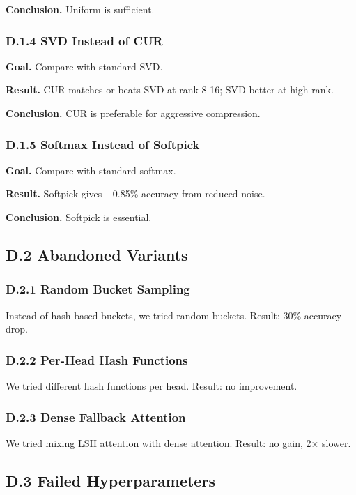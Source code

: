 \textbf{Conclusion.} Uniform is sufficient.

\subsubsection{D.1.4 SVD Instead of CUR}

\textbf{Goal.} Compare with standard SVD.

\textbf{Result.} CUR matches or beats SVD at rank 8-16; SVD better at high rank.

\textbf{Conclusion.} CUR is preferable for aggressive compression.

\subsubsection{D.1.5 Softmax Instead of Softpick}

\textbf{Goal.} Compare with standard softmax.

\textbf{Result.} Softpick gives +0.85\% accuracy from reduced noise.

\textbf{Conclusion.} Softpick is essential.

\subsection{D.2 Abandoned Variants}

\subsubsection{D.2.1 Random Bucket Sampling}

Instead of hash-based buckets, we tried random buckets. Result: 30\% accuracy 
drop.

\subsubsection{D.2.2 Per-Head Hash Functions}

We tried different hash functions per head. Result: no improvement.

\subsubsection{D.2.3 Dense Fallback Attention}

We tried mixing LSH attention with dense attention. Result: no gain, 2$\times$ slower.

\subsection{D.3 Failed Hyperparameters}

